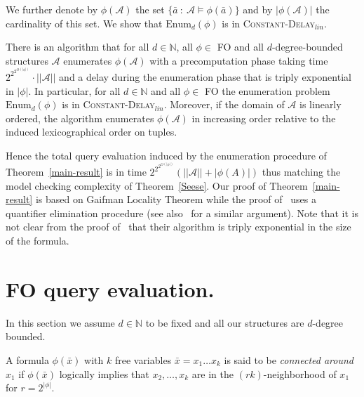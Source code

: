 \documentclass{LMCS}
\newcommand{\CDlin}{{\textsc{Constant-}\textsc{Delay}$_{lin}$}\xspace}
\newcommand\set[1]{\ensuremath{\{#1\}}\xspace}
\newcommand\cA{\ensuremath{{\mathcal A}}\xspace}
\newcommand\FO{\textup{FO}\xspace}
\begin{document}
We further denote by $\phi(\cA)$ the set $\set{\bar a ~:~ \cA\models \phi(\bar
  a)}$ and by $|\phi(\cA)|$ the cardinality of this set.
We show that $\text{Enum}_d(\phi)$ is in \CDlin.

\begin{thm}\label{main-result}
  There is an algorithm that for all $d\in\mathbb{N}$, all $\phi \in$ \FO
  and all $d$-degree-bounded structures \cA enumerates $\phi(\cA)$ with
  a precomputation phase taking time $2^{2^{2^{O(|\phi|)}}}\cdot||\cA||$ and
  a delay during the enumeration phase that is triply exponential in $|\phi|$.
  In particular, for all $d\in\mathbb{N}$ and all $\phi \in$ \FO the
  enumeration problem $\text{Enum}_d(\phi)$ is in \CDlin. Moreover, if the domain
  of \cA is linearly ordered, the algorithm enumerates $\phi(\cA)$ in increasing
  order relative to the induced lexicographical order on tuples.
\end{thm}

Hence the total query evaluation induced by the enumeration procedure of
Theorem~\ref{main-result} is in time $2^{2^{2^{O(|\phi|)}}}(||\cA||+|\phi(A)|)$
thus matching the model checking complexity of Theorem~\ref{Seese}.  Our
proof of Theorem~\ref{main-result} is based on Gaifman Locality Theorem while the
proof of~\cite{DurandGrandjean07} uses a quantifier elimination procedure (see
also~\cite{Lindell08} for a similar argument).
Note that it is not clear from the proof of~\cite{DurandGrandjean07} that their
algorithm is triply exponential in the size of the formula.

\section{\FO query evaluation.}

In this section we assume $d\in\mathbb{N}$ to be fixed and all our structures
are $d$-degree bounded.

A formula $\phi(\bar x)$ with $k$ free variables $\bar x=x_{1} \ldots x_{k}$ is said
to be \emph{connected around $x_1$} if $\phi(\bar x)$ logically implies
that $x_2,\ldots,x_k$ are in the $(rk)$-neighborhood of $x_1$ for $r=2^{|\phi|}$.
\end{document}
